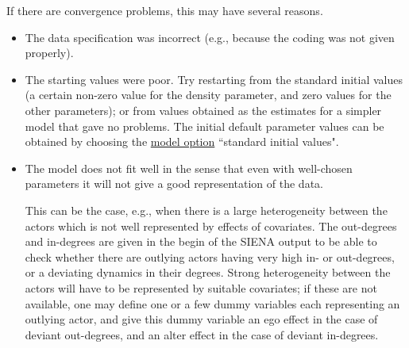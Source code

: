 \documentclass[a4paper,fleqn]{article}
\newcommand{\+}{\, + \,}
\newcommand{\SI}{{\sf SIENA }}
\begin{document}
{If there are convergence problems, this may have several reasons.
\begin{itemize}
\item The data specification was incorrect (e.g., because the coding
      was not given properly).
\item The starting values were poor.
      Try restarting from the standard initial values
      (a certain non-zero value for the
      density parameter, and zero values for the other parameters);
      or from values obtained as the estimates for a simpler model
      that gave no problems.
      The initial default parameter values can be obtained
      by choosing the  \hyperlink{T_S_options}{model option}
      ``standard initial values".   \\

\item The model does not fit well in the sense that even with well-chosen
      parameters it will not give a good representation of the data.

      This can be the case, e.g., when there is a large heterogeneity
      between the actors which is not well represented by effects
      of covariates.
      The out-degrees and in-degrees are given in the begin of the \SI output
      to be able to check whether there are outlying actors having very high
      in- or out-degrees, or a deviating dynamics in their degrees.
      Strong heterogeneity between the actors will have to be
      represented by suitable covariates; if these are not available,
      one may define one or a few dummy variables each representing
      an outlying actor, and give this dummy variable an ego effect
      in the case of deviant out-degrees, and an alter effect in the
      case of deviant in-degrees.


\end{itemize}}
\end{document}
